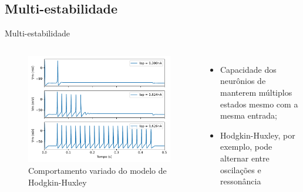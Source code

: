 \subsection{Multi-estabilidade}
\begin{frame}{Multi-estabilidade}
	\begin{columns}[t]
		\column{5cm}
			\begin{figure}[tb]
				\centering
				\caption{Comportamento variado do modelo de Hodgkin-Huxley}
				\label{fig:hhdinamico}
				\includegraphics[width=0.9\linewidth]{figs/hh_dinamico}
			\end{figure}
		\column{5cm}
			\begin{itemize}
				\item Capacidade dos neurônios de manterem múltiplos estados mesmo com a mesma entrada;
				\item Hodgkin-Huxley, por exemplo, pode alternar entre oscilações e ressonância
			\end{itemize}
	\end{columns}
\end{frame}

